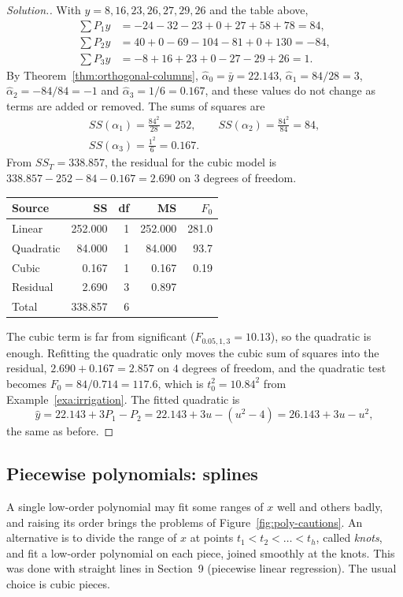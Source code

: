 \documentclass[11pt,a4paper]{article}
\numberwithin{equation}{section}
\theoremstyle{definition}
\newenvironment{solution}
  {\renewcommand{\qedsymbol}{}\begin{proof}[\textit{Solution}.]}
  {\end{proof}}
\begin{document}
\begin{solution}
With $y = 8, 16, 23, 26, 27, 29, 26$ and the table above,
\begin{align*}
\textstyle\sum P_1y &= -24 - 32 - 23 + 0 + 27 + 58 + 78 = 84 , \\
\textstyle\sum P_2y &= 40 + 0 - 69 - 104 - 81 + 0 + 130 = -84 , \\
\textstyle\sum P_3y &= -8 + 16 + 23 + 0 - 27 - 29 + 26 = 1 .
\end{align*}
By Theorem~\ref{thm:orthogonal-columns}, $\hat\alpha_0 = \bar y = 22.143$, $\hat\alpha_1 = 84/28 = 3$,
$\hat\alpha_2 = -84/84 = -1$ and $\hat\alpha_3 = 1/6 = 0.167$, and these values do not change as terms are added or removed. The
sums of squares are
\begin{gather*}
SS(\alpha_1) = \frac{84^2}{28} = 252, \qquad SS(\alpha_2) = \frac{84^2}{84} = 84, \\
SS(\alpha_3) = \frac{1^2}{6} = 0.167 .
\end{gather*}
From $SS_T = 338.857$, the residual for the cubic model is $338.857 - 252 - 84 - 0.167 = 2.690$ on $3$ degrees of
freedom.
\begin{center}
\begin{tabular}{lrrrr}
Source & SS & df & MS & $F_0$ \\
\hline
Linear & 252.000 & 1 & 252.000 & 281.0 \\
Quadratic & 84.000 & 1 & 84.000 & 93.7 \\
Cubic & 0.167 & 1 & 0.167 & 0.19 \\
Residual & 2.690 & 3 & 0.897 & \\
\hline
Total & 338.857 & 6 & & \\
\end{tabular}
\end{center}
The cubic term is far from significant ($F_{0.05,1,3} = 10.13$), so the quadratic is enough. Refitting the quadratic only
moves the cubic sum of squares into the residual, $2.690 + 0.167 = 2.857$ on $4$ degrees of freedom, and the quadratic
test becomes $F_0 = 84/0.714 = 117.6$, which is $t_0^2 = 10.84^2$ from Example~\ref{exa:irrigation}. The fitted quadratic is
\[
\hat y = 22.143 + 3P_1 - P_2 = 22.143 + 3u - (u^2 - 4) = 26.143 + 3u - u^2 ,
\]
the same as before.
\end{solution}

\subsection{Piecewise polynomials: splines}
A single low-order polynomial may fit some ranges of $x$ well and others badly, and raising its order brings
the problems of Figure~\ref{fig:poly-cautions}. An alternative is to divide the range of $x$ at points
$t_1 < t_2 < \dots < t_h$, called \emph{knots}, and fit a low-order polynomial on each piece, joined smoothly at the knots.
This was done with straight lines in Section~9 (piecewise linear regression). The usual choice is cubic pieces.
\end{document}
